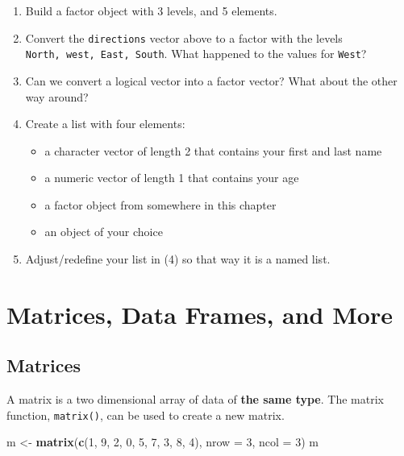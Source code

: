 \documentclass[
]{book}
\newenvironment{Shaded}{\begin{snugshade}}{\end{snugshade}}
\newcommand{\DataTypeTok}[1]{\textcolor[rgb]{0.13,0.29,0.53}{#1}}
\newcommand{\DecValTok}[1]{\textcolor[rgb]{0.00,0.00,0.81}{#1}}
\newcommand{\KeywordTok}[1]{\textcolor[rgb]{0.13,0.29,0.53}{\textbf{#1}}}
\newcommand{\NormalTok}[1]{#1}
\newcommand{\StringTok}[1]{\textcolor[rgb]{0.31,0.60,0.02}{#1}}
\begin{document}
\begin{enumerate}
\def\labelenumi{\arabic{enumi})}
\item
  Build a factor object with 3 levels, and 5 elements.
\item
  Convert the \texttt{directions} vector above to a factor with the levels \texttt{North,\ west,\ East,\ South}. What happened to the values for \texttt{West}?
\item
  Can we convert a logical vector into a factor vector? What about the other way around?
\item
  Create a list with four elements:

  \begin{itemize}
  \item
    a character vector of length 2 that contains your first and last name
  \item
    a numeric vector of length 1 that contains your age
  \item
    a factor object from somewhere in this chapter
  \item
    an object of your choice
  \end{itemize}
\item
  Adjust/redefine your list in (4) so that way it is a named list.
\end{enumerate}

\hypertarget{matrices-data-frames-and-more}{%
\chapter{Matrices, Data Frames, and More}\label{matrices-data-frames-and-more}}

\hypertarget{matrices}{%
\section{Matrices}\label{matrices}}

A matrix is a two dimensional array of data of \textbf{the same type}. The matrix function, \texttt{matrix()}, can be used to create a new matrix.

\begin{Shaded}
\begin{Highlighting}[]
\NormalTok{m <-}\StringTok{ }\KeywordTok{matrix}\NormalTok{(}\KeywordTok{c}\NormalTok{(}\DecValTok{1}\NormalTok{, }\DecValTok{9}\NormalTok{, }\DecValTok{2}\NormalTok{, }\DecValTok{0}\NormalTok{, }\DecValTok{5}\NormalTok{, }\DecValTok{7}\NormalTok{, }\DecValTok{3}\NormalTok{, }\DecValTok{8}\NormalTok{, }\DecValTok{4}\NormalTok{), }\DataTypeTok{nrow =} \DecValTok{3}\NormalTok{, }\DataTypeTok{ncol =} \DecValTok{3}\NormalTok{)}
\NormalTok{m}
\end{Highlighting}
\end{Shaded}
\end{document}
